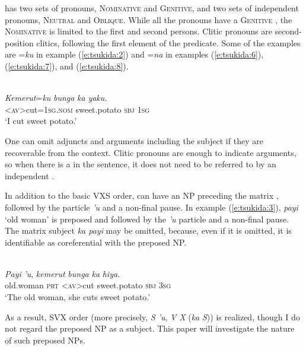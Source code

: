 \documentclass[output=paper
,modfonts
,nonflat]{langsci/langscibook}
\begin{document}
 has two sets of  pronouns, \textsc{Nominative} and \textsc{Genitive}, and two sets of independent pronouns, \textsc{Neutral} and \textsc{Oblique}. While all the pronouns have a \textsc{Genitive} , the \textsc{Nominative}  is limited to the first and second persons. Clitic pronouns are second-position clitics, following the first element of the predicate. Some of the examples are =\textit{ku} in example (\ref{e:tsukida:2}) and =\textit{na} in examples (\ref{e:tsukida:6}), (\ref{e:tsukida:7}), and (\ref{e:tsukida:8}). 

\begin{exe}
	\label{e:tsukida:2}\\
	\gll \textit{K}{\USSmaller}\textit{em}{\USGreater}\textit{erut}=\textit{ku} \textit{bunga} {\USOParen}\textit{ka}  \textit{yaku}{\USCParen}.\\
	\textsc{<av>}cut\textsc{=1sg.nom} sweet.potato \phantom{(}\textsc{sbj}  \textsc{1sg}\\
	\glt ‘I cut sweet potato.’
\end{exe}

\noindent
One can omit adjuncts and arguments including the subject if they are recoverable from the context. Clitic pronouns are enough to indicate arguments, so when there is a   in the sentence, it does not need to be referred to by an independent . 

In addition to the basic VXS order,  can have an NP preceding the matrix , followed by the particle \textit{'u} and a non-final pause. In example (\ref{e:tsukida:3}), \textit{payi} ‘old woman’ is preposed and followed by the \textit{'u} particle and a non-final pause. The matrix subject \textit{ka payi} may be omitted, because, even if it is omitted, it is identifiable as coreferential with the preposed NP.

\begin{exe}
	\label{e:tsukida:3}\\
	\gll \textit{Payi} \textit{'u}, \textit{k}{\USSmaller}\textit{em}{\USGreater}\textit{erut} \textit{bunga} {\USOParen}\textit{ka}  \textit{hiya}{\USCParen}.\\
	old.woman \textsc{prt} \textsc{<av>}cut sweet.potato \phantom{(}\textsc{sbj} \textsc{3sg}\\
	\glt ‘The old woman, she cuts sweet potato.’
\end{exe}

\noindent
As a result, SVX order (more precisely, \textit{S 'u}, \textit{V} \textit{X} (\textit{ka} \textit{S})) is realized, though I do not regard the preposed NP as a subject. This paper will investigate the nature of such preposed NPs.
\end{document}
